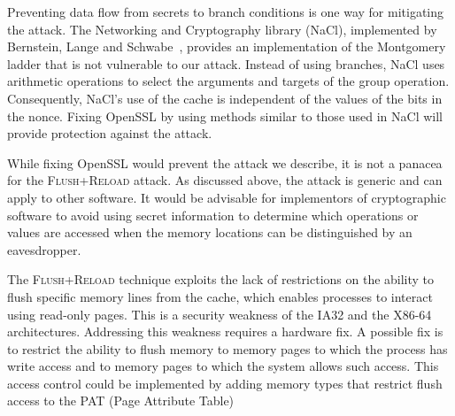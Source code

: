 \documentclass[twocolumn]{svjour3}
\newcommand{\fl}{\textsc{Flu\-sh+\allowbreak Re\-load}\xspace}
\begin{document}
Preventing data flow from secrets to branch conditions is one way for mitigating the attack.
The Networking and Cryptography library (NaCl), implemented by Bernstein, Lange and Schwabe~\cite{dan-tan-peter}, 
provides an implementation of the Montgomery ladder that is not vulnerable to our attack.
Instead of using branches, NaCl uses arithmetic operations to select the arguments and targets of the group operation.
Consequently, NaCl's use of the cache is independent of the values of the bits in the nonce.
Fixing OpenSSL by using methods similar to those used in NaCl will provide protection against the attack.

While fixing OpenSSL would prevent the attack we describe, it is not a panacea for the \fl attack.
As discussed above, the attack is generic and can apply to other software.
It would be advisable for implementors of cryptographic software to avoid using secret information to determine which operations 
or values are accessed when the memory locations can be distinguished by an eavesdropper. 


The \fl technique exploits the lack of restrictions
on the ability to flush specific memory lines from the cache,
which enables processes
to interact using read-only pages.
This is a security weakness of the
IA32 and the X86-64 architectures.
Addressing this weakness requires a hardware fix.
A possible fix is 
to restrict  the ability to flush memory to
memory pages to which the process has write access and to
memory pages to which the system allows such access.
This access control could be implemented by adding memory
types that restrict flush access to the PAT (Page Attribute
Table)~\cite[chap. 11]{intel13architecture:3a}

\end{document}
